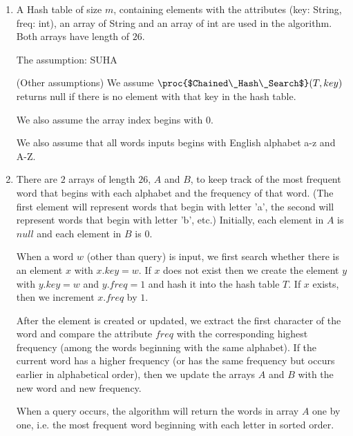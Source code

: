 \documentclass[11pt, answers]{exam}
\theoremstyle{plain}
\theoremstyle{definition}
\begin{document}
\begin{questions}
\begin{solution}
\begin{parts}
\end{parts}
\end{solution}

\question
\begin{solution}

\end{solution}


\question
\begin{solution}
\begin{enumerate}
\item A Hash table of size $m$, containing elements with the attributes (key: String, freq: int), an array of String and an array of int are used in the algorithm. Both arrays have length of $26$.

The assumption: SUHA

(Other assumptions)
We assume $\proc{$Chained\_Hash\_Search$}(T, key)$ returns null if there is no element with that key in the hash table.

We also assume the array index begins with 0.

We also assume that all words inputs begins with English alphabet a-z and A-Z.

\item There are $2$ arrays of length $26$, $A$ and $B$, to keep track of the most frequent word that begins with each alphabet and the frequency of that word. (The first element will represent words that begin with letter 'a', the second will represent words that begin with letter 'b', etc.) Initially, each element in $A$ is $null$ and each element in $B$ is $0$. 

When a word $w$ (other than query) is input, we first search whether there is an element $x$ with $x.key=w$. If $x$ does not exist then we create the element $y$ with $y.key=w$ and $y.freq=1$ and hash it into the hash table $T$. If $x$ exists, then we increment $x.freq$ by $1$.

After the element is created or updated, we extract the first character of the word and compare the attribute $freq$ with the corresponding highest frequency (among the words beginning with the same alphabet). If the current word has a higher frequency (or has the same frequency but occurs earlier in alphabetical order), then we update the arrays $A$ and $B$ with the new word and new frequency. 

When a query occurs, the algorithm will return the words in array $A$ one by one, i.e. the most frequent word beginning with each letter in sorted order.


\end{enumerate}
\end{solution}
\end{questions}
\end{document}
